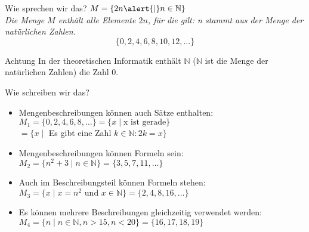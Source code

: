%
%
%
%

\begin{frame}[fragile]{Wie sprechen wir das?}
    $M = \{2n \alert{\mid} n \in \mathbb{N}\}$ \\

    \emph{Die Menge $M$ enthält alle Elemente $2n$, \alert{für die gilt}: n stammt aus der Menge der natürlichen Zahlen.}
    \vspace{5pt}
    $$
        \{0, 2, 4, 6, 8, 10, 12, \dots \}
    $$

    \begin{alertblock}{Achtung}
        In der theoretischen Informatik enthält $\mathbb{N}$ ($\mathbb{N}$ ist die Menge der natürlichen Zahlen) die Zahl 0.
    \end{alertblock}

\end{frame}


\begin{frame}[fragile]{Wie schreiben wir das?}
    \begin{itemize}[<+->]
        \item Mengenbeschreibungen können auch Sätze enthalten:
              $M_1 = \{0,2,4,6,8,\dots\} = \{x \mid \text{x ist gerade}\}$\\
              \hspace{4.5mm}$= \{x \mid$ Es gibt eine Zahl $k \in \mathbb{N} : 2k = x\}$\\

        \item Mengenbeschreibungen können Formeln sein:
              $M_2 = \{n^2+3 \mid n \in \mathbb{N}\} = \{3, 5, 7, 11, \dots\}$

        \item Auch im Beschreibungsteil können Formeln stehen:
              $M_3 = \{x \mid x = n^2 \text{ und } x\in \mathbb{N}\} = \{2, 4, 8, 16, \dots\}$

        \item Es können mehrere Beschreibungen gleichzeitig verwendet werden:
              $M_4 = \{n \mid n \in \mathbb{N}, n > 15, n < 20\} = \{16, 17, 18, 19\}$\\

    \end{itemize}
\end{frame}


